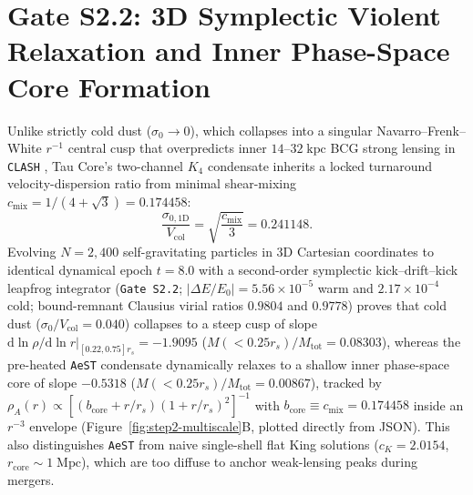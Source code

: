 \documentclass[11pt,a4paper]{article}
\begin{document}
\section{Gate S2.2: 3D Symplectic Violent Relaxation and Inner Phase-Space Core Formation}
\label{sec:step2-relaxation}
Unlike strictly cold dust ($\sigma_0 \to 0$), which collapses into a singular Navarro--Frenk--White $r^{-1}$ central cusp that overpredicts inner $14\text{--}32\;\mathrm{kpc}$ BCG strong lensing in \texttt{CLASH} \cite{Tian2020}, Tau Core's two-channel $K_4$ condensate inherits a locked turnaround velocity-dispersion ratio from minimal shear-mixing $c_{\mathrm{mix}} = 1/(4+\sqrt{3}) = 0.174458$:
\begin{equation}
    \frac{\sigma_{0,1\mathrm{D}}}{V_{\mathrm{col}}} = \sqrt{\frac{c_{\mathrm{mix}}}{3}} = 0.241148.
    \label{eq:turnaround-preheating}
\end{equation}
Evolving $N = 2{,}400$ self-gravitating particles in 3D Cartesian coordinates to identical dynamical epoch $t = 8.0$ with a second-order symplectic kick--drift--kick leapfrog integrator (\texttt{Gate S2.2}; $|\Delta E/E_0| = 5.56\times 10^{-5}$ warm and $2.17\times 10^{-4}$ cold; bound-remnant Clausius virial ratios $0.9804$ and $0.9778$) proves that cold dust ($\sigma_0/V_{\mathrm{col}} = 0.040$) collapses to a steep cusp of slope $\mathrm{d}\ln\rho/\mathrm{d}\ln r|_{[0.22,0.75]r_s} = -1.9095$ ($M(<0.25r_s)/M_{\mathrm{tot}} = 0.08303$), whereas the pre-heated \texttt{AeST} condensate dynamically relaxes to a shallow inner phase-space core of slope $-0.5318$ ($M(<0.25r_s)/M_{\mathrm{tot}} = 0.00867$), tracked by $\rho_A(r) \propto [(b_{\mathrm{core}} + r/r_s)(1 + r/r_s)^2]^{-1}$ with $b_{\mathrm{core}} \equiv c_{\mathrm{mix}} = 0.174458$ inside an $r^{-3}$ envelope (Figure~\ref{fig:step2-multiscale}B, plotted directly from JSON). This also distinguishes \texttt{AeST} from naive single-shell flat King solutions ($c_K = 2.0154$, $r_{\mathrm{core}} \sim 1\;\mathrm{Mpc}$), which are too diffuse to anchor weak-lensing peaks during mergers.
\end{document}
